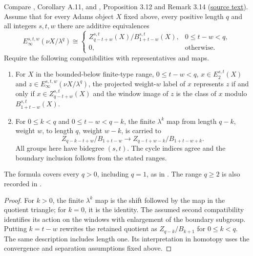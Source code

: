 \begin{proposition}
\label{sem:Literature:infinite-finite-window}
\label{paper:3.12}
\label{prop:59f111f}
Compare \cite{BHS}, Corollary A.11, and \cite{LWX126}, Proposition 3.12
and Remark 3.14 (\href{paper/main.tex.html#L849}{source text}).
Assume that for every Adams object $X$ fixed above, every positive
length $q$ and all integers $s,t,w$ there are additive equivalences
\[
 E_\infty^{s,t,w}(\nu X/\lambda^q)\cong
 \begin{cases}
 Z_{q-t+w}^{s,t}(X)/B_{1+t-w}^{s,t}(X),&0\le t-w<q,\\
 0,&\text{otherwise}.
 \end{cases}
\]
Require the following compatibilities with representatives and maps.
\begin{enumerate}
\item For $X$ in the bounded-below finite-type range, $0\le t-w<q$,
$x\in E_2^{s,t}(X)$ and $z\in E_\infty^{s,t,w}(\nu X/\lambda^q)$, the
projected weight-$w$ label of $x$ represents $z$ if and only if
$x\in Z_{q-t+w}^{s,t}(X)$ and the window image of $z$ is the class of
$x$ modulo $B_{1+t-w}^{s,t}(X)$.
\item For $0\le k<q$ and $0\le t-w<q-k$, the finite $\lambda^k$ map
from length $q-k$, weight $w$, to length $q$, weight $w-k$, is carried to
\[
 Z_{q-k-t+w}/B_{1+t-w}\longrightarrow
 Z_{q-t+w-k}/B_{1+t-w+k}.
\]
All groups here have bidegree $(s,t)$. The cycle indices agree and the
boundary inclusion follows from the stated ranges.
\end{enumerate}
The formula covers every $q>0$, including $q=1$, as in
\cite[Corollary A.11]{BHS}. The range $q\ge2$ is also recorded in
\cite[Proposition 3.12]{LWX126}.

\end{proposition}
\begin{proof}
For $k>0$, the finite $\lambda^k$ map is the shift followed by the map
in the quotient triangle; for $k=0$, it is the identity. The assumed
second compatibility identifies its action on the windows with
enlargement of the boundary subgroup.
Putting $k=t-w$ rewrites
the retained quotient as $Z_{q-k}/B_{k+1}$ for $0\le k<q$.
The same description includes length one. Its interpretation in
homotopy uses the convergence and separation assumptions fixed above.
\end{proof}

